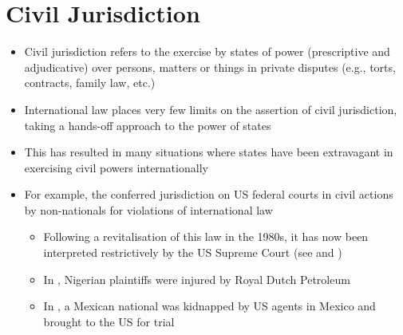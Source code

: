 \section{Civil Jurisdiction}
\begin{itemize}
    \item Civil jurisdiction refers to the exercise by states of power (prescriptive and adjudicative) over persons, matters or things in private disputes (e.g., torts, contracts, family law, etc.)
    \item International law places very few limits on the assertion of civil jurisdiction, taking a hands-off approach to the power of states
    \item This has resulted in many situations where states have been extravagant in exercising civil powers internationally
    \item For example, the  conferred jurisdiction on US federal courts in civil actions by non-nationals for violations of international law
    \begin{itemize}
        \item Following a revitalisation of this law in the 1980s, it has now been interpreted restrictively by the US Supreme Court (see  and )
        \item In , Nigerian plaintiffs were injured by Royal Dutch Petroleum
        \item In , a Mexican national was kidnapped by US agents in Mexico and brought to the US for trial
    \end{itemize}
\end{itemize}

